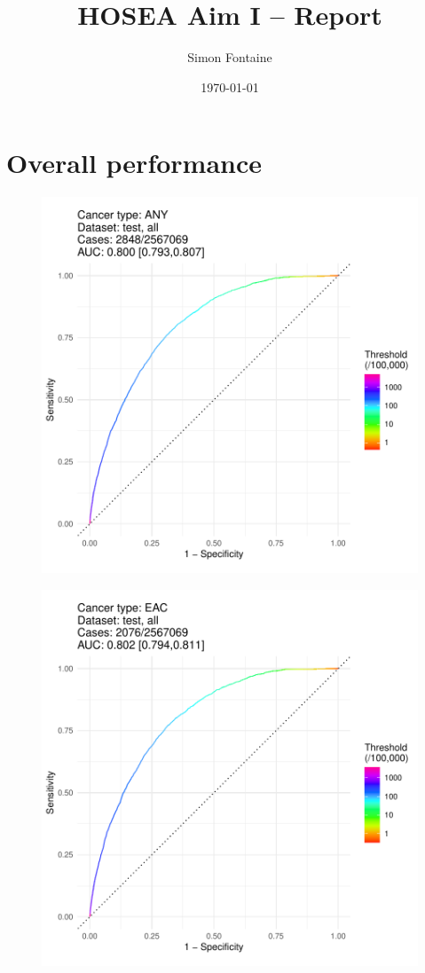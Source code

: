 \documentclass[english]{article}
\title{HOSEA Aim I -- Report}
\author{Simon Fontaine}
\date{\today}
\begin{document}
\maketitle
\tableofcontents

\newpage
\clearpage
\section{Overall performance}

\begin{figure}[ht]
\includegraphics[width=1.0\linewidth]{roc/ANY_all.pdf}
\end{figure}
\begin{figure}[ht]
\includegraphics[width=1.0\linewidth]{roc/EAC_all.pdf}
\end{figure}
\end{document}
